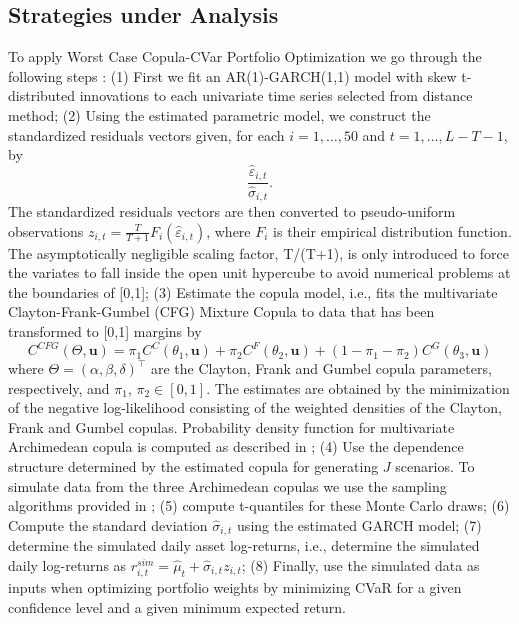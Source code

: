 \documentclass[a4paper,10pt]{article}
\begin{document}
\subsection{Strategies under Analysis}

To apply Worst Case Copula-CVar Portfolio Optimization we go through the
following steps : (1) First we fit an AR(1)-GARCH(1,1) model with skew t-distributed
innovations to each univariate time series selected from distance method; (2) Using the estimated parametric model, we construct the standardized residuals vectors given, for each $i=1,\ldots,50$ and $t=1,\ldots,L-T-1$, by
\begin{equation*}
\frac{\widehat{\varepsilon }_{i,t}}{\widehat{\sigma }_{i,t}}.
\end{equation*}%
The standardized residuals vectors are then converted to pseudo-uniform observations $z_{i,t}=\frac{T}{T+1}F_{i}\left( \widehat{\varepsilon }_{i,t}\right) $, where $F_{i}$ is their empirical distribution function. The asymptotically negligible scaling factor, T/(T+1), is only introduced to force the variates to fall inside the open unit hypercube to avoid numerical problems at the boundaries of [0,1]; (3) Estimate the copula model, i.e., fits the multivariate Clayton-Frank-Gumbel (CFG) Mixture Copula to data that has been transformed to [0,1] margins by
\begin{equation}
C^{CFG}( \Theta ,\mathbf{u}) =\pi _{1}C^{C}( \theta _{1},\mathbf{u}) +\pi
_{2}C^{F}( \theta _{2},\mathbf{u}) +(1-\pi _{1}-\pi _{2}) C^{G}( \theta _{3},\mathbf{u})
\end{equation}
where $\Theta=\left(\alpha,\beta,\delta\right)^{\top }$ are the Clayton, Frank and Gumbel copula parameters, respectively, and $\pi_{1}$, $\pi_{2} \in [0,1]$. The estimates are obtained by the minimization of the negative log-likelihood consisting of the weighted densities of the Clayton, Frank and Gumbel copulas. Probability density function for multivariate Archimedean copula is computed as described in \citet*{mcneil2009}; (4) Use the dependence structure determined by the estimated copula for generating $J $ scenarios. To simulate data from the three Archimedean copulas we use the sampling algorithms provided in \citet*{melchiori2006}; (5) compute
t-quantiles for these Monte Carlo draws; (6) Compute the standard deviation $\widehat{\sigma }_{i,t}$ using the estimated GARCH model; (7) determine the simulated daily asset log-returns, i.e., determine the simulated daily log-returns as $r_{i,t}^{sim}=\widehat{\mu }_{t}+\widehat{\sigma }_{i,t}z_{i,t}$; (8) Finally, use the simulated data as inputs when
optimizing portfolio weights by minimizing CVaR for a given confidence level and a given minimum expected return.
\end{document}
